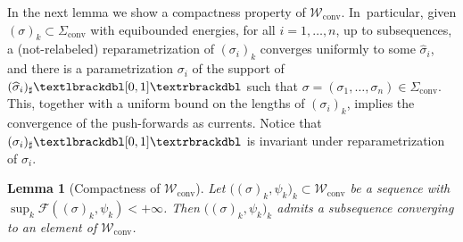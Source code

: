 \documentclass[11pt]{article}
\numberwithin{equation}{section}
\let\curves\Sigma
\newcommand\admclassconv{{\mathcal W_\mathrm{conv}}}
\newcommand\convexcurves{\curves_\mathrm{conv}}
\newcommand{\jump}[1]{\textup{\textlbrackdbl}{#1}\textup{\textrbrackdbl}}
\newtheorem{lemma}[theorem]{Lemma}
\theoremstyle{definition}
\begin{document}
In the next lemma we show a compactness property of $\admclassconv$. In~particular, given $(\sigma)_k\subset\convexcurves$ with equibounded energies, for all $i=1,\dots,n$, up to subsequences, a (not-relabeled) reparametrization of $(\sigma_i)_k$ converges uniformly to some $\widehat\sigma_i$, and there is a parametrization $\sigma_i$ of the support of $(\widehat \sigma_i)_\sharp\jump{[0,1]}$ such that $\sigma=(\sigma_1,\dots,\sigma_n)\in\convexcurves$. This,
together with a uniform bound on the lengths of $(\sigma_i)_k$, implies the convergence of the push-forwards as currents. Notice that $(\sigma_i)_\sharp\jump{[0,1]}$ is invariant under reparametrization of $\sigma_i$.

\begin{lemma}[Compactness of $\admclassconv$]\label{lem:compactness}
Let
$\big((\sigma)_{k},\psi_k\big)_k
\subset\admclassconv$ be a sequence with\\ $\sup_k\mathcal F((\sigma)_k,\psi_k)<+\infty$. Then
$\big((\sigma)_{k},\psi_k\big)_k$ admits
a subsequence converging to an element of $\admclassconv$.
\end{lemma}
\end{document}
